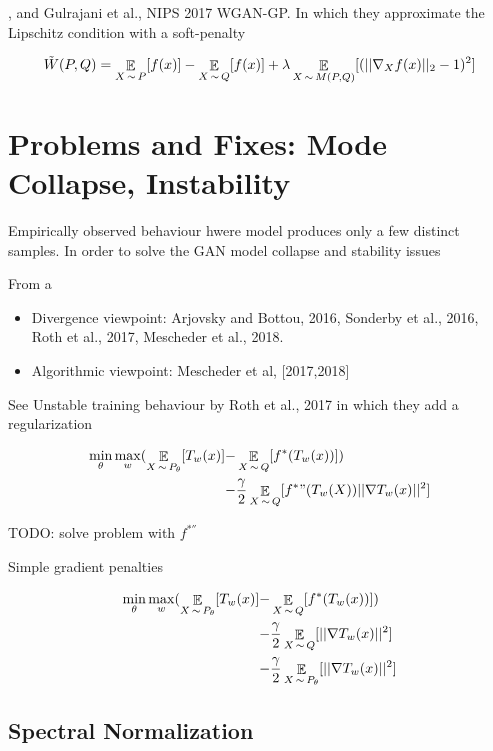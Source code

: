 \documentclass[b5paper]{report}
\begin{document}
, and Gulrajani et al., NIPS 2017 WGAN-GP. In which they approximate the
Lipschitz condition with a soft-penalty

\begin{equation}
  \tilde{W}(P,Q) = \operatorname*{\mathbb{\mathop{E}}}_{X \operatorname*{\sim} P}[f(x)] - \operatorname*{\mathbb{\mathop{E}}}_{X\operatorname*{\sim} Q} [f(x)] +
  \lambda \operatorname*{\mathbb{\mathop{E}}}_{X \operatorname*{\sim} M(P,Q)} [(||\nabla_X f(x) ||_2 -1)^2]
\end{equation}

\section{Problems and Fixes: Mode Collapse, Instability}

Empirically observed behaviour hwere model produces only a few distinct
samples. In order to solve the GAN model collapse and stability issues

From a

\begin{itemize}
  \item Divergence viewpoint: Arjovsky and Bottou, 2016, Sonderby et al., 2016,
    Roth et al., 2017, Mescheder et al., 2018.
  \item Algorithmic viewpoint: Mescheder et al, [2017,2018]
\end{itemize}

See Unstable training behaviour by Roth et al., 2017 in which they add a
regularization

\begin{align}
  \min_\theta \max_w ( \operatorname*{\mathbb{\mathop{E}}}_{X\operatorname*{\sim} P_\theta}[T_w(x)]
    -& \operatorname*{\mathbb{\mathop{E}}}_{X\operatorname*{\sim} Q}[f^*(T_w(x))]) \\
  -& \frac{\gamma}{2} \operatorname*{\mathbb{\mathop{E}}}_{X\operatorname*{\sim} Q}[ f^*"(T_w(X)) || \nabla T_w(x)||^2]
\end{align}

TODO: solve problem with $f^{*''}$

Simple gradient penalties

\begin{align}
  \min_\theta \max_w ( \operatorname*{\mathbb{\mathop{E}}}_{X\operatorname*{\sim} P_\theta}[T_w(x)]
    -& \operatorname*{\mathbb{\mathop{E}}}_{X\operatorname*{\sim} Q}[f^*(T_w(x))])  \\
    -& \frac{\gamma}{2} \operatorname*{\mathbb{\mathop{E}}}_{X\operatorname*{\sim} Q}[|| \nabla T_w(x)||^2] \\
    -& \frac{\gamma}{2} \operatorname*{\mathbb{\mathop{E}}}_{X\operatorname*{\sim} P_\theta}[|| \nabla T_w(x)||^2]
\end{align}

\subsection{Spectral Normalization}
\end{document}
